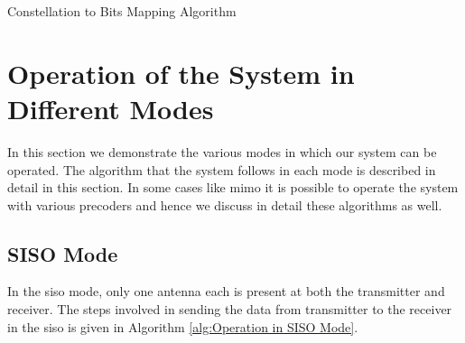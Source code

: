 \begin{algorithm}[!htbp]
\caption{Constellation to Bits Mapping Algorithm}
\label{alg:Working of Demodulator}
\begin{algorithmic}
		\ELSE
		\ENDIF
		\ENDWHILE
	\ENDIF
\ENDWHILE
\end{algorithmic}
\end{algorithm} 



\section{Operation of the System in Different Modes}
In this section we demonstrate the various modes in which our system can be operated. The algorithm that the system follows in each mode is described in detail in this section. In some cases like \acrshort{mimo} it is possible to operate the system with various precoders and hence we discuss in detail these algorithms as well.

\subsection{SISO Mode}
In the \acrlong{siso} mode, only one antenna each is present at both the transmitter and receiver. The steps involved in sending the data from transmitter to the receiver in the \acrshort{siso} is given in Algorithm \ref{alg:Operation in SISO Mode}.

